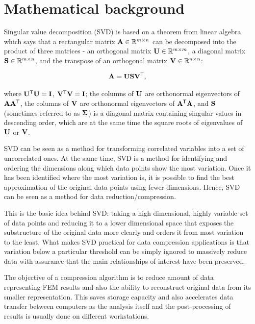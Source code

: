 \section{Mathematical background}
\label{sec:math}


Singular value decomposition (SVD) \cite{Baker2005, Kalman1996, Golub1996} is based on a theorem from linear algebra which says that a rectangular matrix $\mathbf{A} \in \mathbb{R}^{m \times n}$ can be decomposed into the product of three matrices - an orthogonal matrix $\mathbf{U} \in \mathbb{R}^{m \times m}$, a diagonal
matrix $\mathbf{S} \in \mathbb{R}^{m \times n}$, and the transpose of an orthogonal matrix $\mathbf{V} \in \mathbb{R}^{n \times n}$:

\begin{equation}
\mathbf{A} = \mathbf{U} \mathbf{S} \mathbf{V}^\mathsf{T},
\label{eq:svd-def}
\end{equation}

\noindent
where $\mathbf{U^\mathsf{T}U} = \mathbf{I}$, $\mathbf{V^\mathsf{T}V} = \mathbf{I}$; the columns of $\mathbf{U}$ are orthonormal eigenvectors of $\mathbf{AA^\mathsf{T}}$, the columns of $\mathbf{V}$ are orthonormal eigenvectors of $\mathbf{A^\mathsf{T}A}$, and $\mathbf{S}$ (sometimes referred to as $\mathbf{\Sigma}$) is a diagonal matrix containing singular values in descending order, which are at the same time the square roots of eigenvalues of $\mathbf{U}$ or $\mathbf{V}$.

SVD can be seen as a method for transforming correlated variables into a set of uncorrelated ones. At the same time, SVD is a method for identifying and ordering the dimensions along which data points show the most variation. Once it has been identified where the most variation is, it is possible to find the best approximation of the original data points using fewer dimensions. Hence, SVD can be seen as a method for data reduction/compression.

This is the basic idea behind SVD: taking a high dimensional, highly variable set of data points and reducing it to a lower dimensional space that exposes the substructure of the original data more clearly and orders it from most variation to the least. What makes SVD practical for data compression applications is that variation below a particular threshold can be simply ignored to massively reduce data with assurance that the main relationships of interest have been preserved.

The objective of a compression algorithm is to reduce amount of data representing FEM results and also the ability to reconstruct original data from its smaller representation. This saves storage capacity and also accelerates data transfer between computers as the analysis itself and the post-processing of results is usually done on different workstations.

